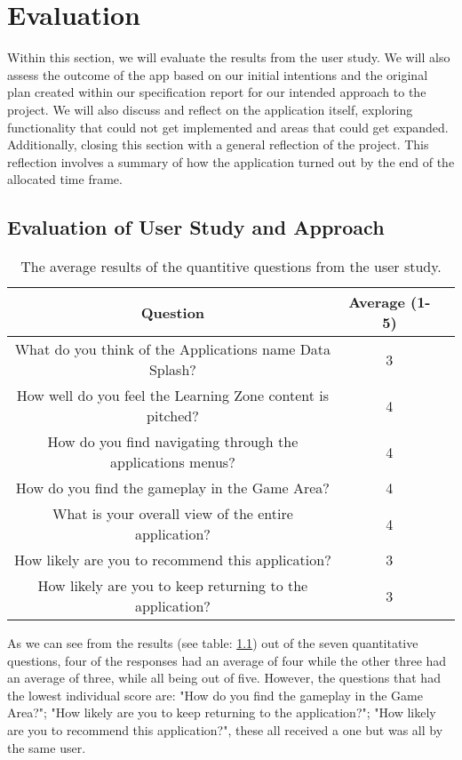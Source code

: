 \chapter{Evaluation}
	Within this section, we will evaluate the results from the user study. We will also assess the outcome of the app based on our initial intentions and the original plan created within our specification report for our intended approach to the project. We will also discuss and reflect on the application itself, exploring functionality that could not get implemented and areas that could get expanded. Additionally, closing this section with a general reflection of the project. This reflection involves a summary of how the application turned out by the end of the allocated time frame. 

	\section{Evaluation of User Study and Approach}
	
	\begin{table}[h!]
		\centering
			\begin{tabular}{|c|c|c }
				\hline
				Question & Average (1-5) \\ 
				\hline
				What do you think of the Applications name Data Splash? & 3 \\ 
				\hline 
				How well do you feel the Learning Zone content is pitched? & 4 \\
				\hline
				How do you find navigating through the applications menus? & 4 \\ 
				\hline 
				How do you find the gameplay in the Game Area? & 4 \\
				\hline
				What is your overall view of the entire application? & 4 \\ 
				\hline 
				How likely are you to recommend this application? & 3 \\
				\hline
				How likely are you to keep returning to the application? & 3 \\  
				\hline
			\end{tabular}
		\caption{The average results of the quantitive questions from the user study.}
		\label{table:results_avg}
	\end{table}
	



	As we can see from the results (see table: \ref{table:results_avg}) out of the seven quantitative questions, four of the responses had an average of four while the other three had an average of three, while all being out of five. However, the questions that had the lowest individual score are: "How do you find the gameplay in the Game Area?"; "How likely are you to keep returning to the application?"; "How likely are you to recommend this application?", these all received a one but was all by the same user.
	
